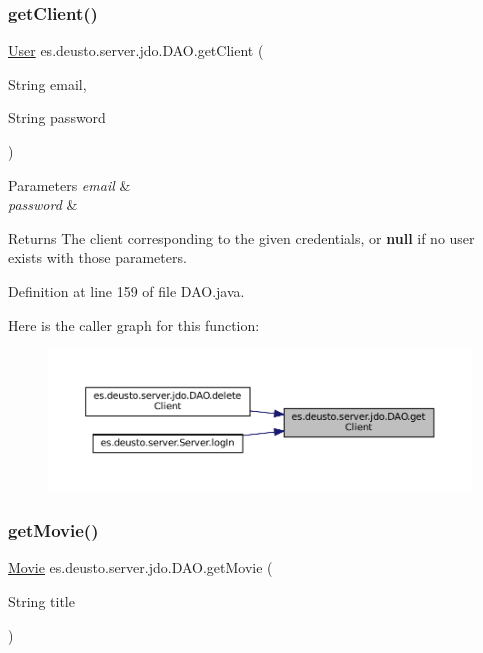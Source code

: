 \subsubsection{\texorpdfstring{getClient()}{getClient()}}
{\footnotesize\ttfamily \mbox{\hyperlink{classes_1_1deusto_1_1server_1_1jdo_1_1_user}{User}} es.\+deusto.\+server.\+jdo.\+D\+A\+O.\+get\+Client (\begin{DoxyParamCaption}\item[{String}]{email,  }\item[{String}]{password }\end{DoxyParamCaption})}


\begin{DoxyParams}{Parameters}
{\em email} & \\
\hline
{\em password} & \\
\hline
\end{DoxyParams}
\begin{DoxyReturn}{Returns}
The client corresponding to the given credentials, or {\bfseries{null}} if no user exists with those parameters. 
\end{DoxyReturn}


Definition at line 159 of file D\+A\+O.\+java.

Here is the caller graph for this function\+:
\nopagebreak
\begin{figure}[H]
\begin{center}
\leavevmode
\includegraphics[width=350pt]{classes_1_1deusto_1_1server_1_1jdo_1_1_d_a_o_a340f51843de8957e9ef8b0c95081512a_icgraph}
\end{center}
\end{figure}
\mbox{\label{classes_1_1deusto_1_1server_1_1jdo_1_1_d_a_o_a9bbbc5fb0fa218f2feefc3c813edc305}} 
\subsubsection{\texorpdfstring{getMovie()}{getMovie()}}
{\footnotesize\ttfamily \mbox{\hyperlink{classes_1_1deusto_1_1server_1_1jdo_1_1_movie}{Movie}} es.\+deusto.\+server.\+jdo.\+D\+A\+O.\+get\+Movie (\begin{DoxyParamCaption}\item[{String}]{title }\end{DoxyParamCaption})}



